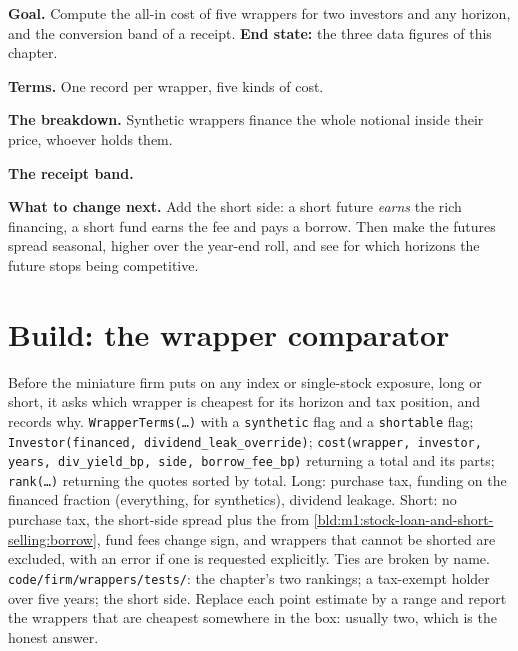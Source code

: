 \begin{tutorial}
\textbf{Goal.} Compute the all-in cost of five wrappers for two investors
and any horizon, and the conversion band of a receipt. \textbf{End state:}
the three data figures of this chapter.
\begin{tutsteps}
\item \textbf{Terms.} One record per wrapper, five kinds of cost.
\label{lst:m1:delta-one-instruments:terms}
\item \textbf{The breakdown.} Synthetic wrappers finance the whole notional
inside their price, whoever holds them.
\label{lst:m1:delta-one-instruments:breakdown}
\item \textbf{The receipt band.}
\label{lst:m1:delta-one-instruments:band}
\end{tutsteps}
\textbf{What to change next.} Add the short side: a short future
\emph{earns} the rich financing, a short fund earns the fee and pays a
borrow. Then make the futures spread seasonal, higher over the year-end
roll, and see for which horizons the future stops being competitive.
\end{tutorial}

\section{Build: the wrapper comparator}\label{bld:m1:delta-one-instruments:comparator}

\begin{build}
 Before the miniature firm puts on any index or
single-stock exposure, long or short, it asks which wrapper is cheapest for
its horizon and tax position, and records why.
 \texttt{WrapperTerms(\ldots)} with a \texttt{synthetic}
flag and a \texttt{shortable} flag; \texttt{Investor(financed,
dividend\_leak\_override)}; \texttt{cost(wrapper, investor, years,
div\_yield\_bp, side, borrow\_fee\_bp)} returning a total and its parts;
\texttt{rank(\ldots)} returning the quotes sorted by total.
 Long: purchase tax, funding on the financed fraction
(everything, for synthetics), dividend leakage. Short: no purchase tax, the
short-side spread plus the  from
\cref{bld:m1:stock-loan-and-short-selling:borrow}, fund fees change sign, and
wrappers that cannot be shorted are excluded, with an error if one is
requested explicitly. Ties are broken by name.
 \texttt{code/firm/wrappers/tests/}: the chapter's
two rankings; a tax-exempt holder over five years; the short side.
 Replace each point estimate by a range and report the
wrappers that are cheapest somewhere in the box: usually two, which is the
honest answer.
\end{build}


